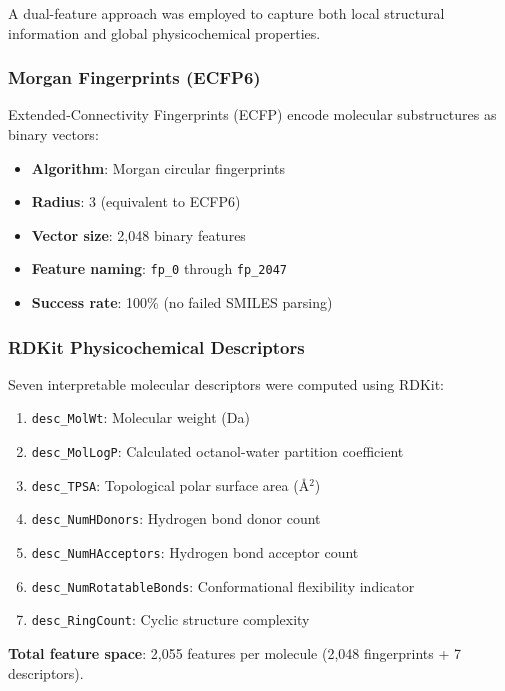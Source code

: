 \documentclass[11pt,a4paper]{article}
\newcommand{\smiles}{SMILES}
\begin{document}
A dual-feature approach was employed to capture both local structural information and global physicochemical properties.

\subsubsection{Morgan Fingerprints (ECFP6)}

Extended-Connectivity Fingerprints (ECFP) encode molecular substructures as binary vectors:

\begin{itemize}
    \item \textbf{Algorithm}: Morgan circular fingerprints
    \item \textbf{Radius}: 3 (equivalent to ECFP6)
    \item \textbf{Vector size}: 2,048 binary features
    \item \textbf{Feature naming}: \texttt{fp\_0} through \texttt{fp\_2047}
    \item \textbf{Success rate}: 100\% (no failed \smiles{} parsing)
\end{itemize}

\subsubsection{RDKit Physicochemical Descriptors}

Seven interpretable molecular descriptors were computed using RDKit:

\begin{enumerate}
    \item \texttt{desc\_MolWt}: Molecular weight (Da)
    \item \texttt{desc\_MolLogP}: Calculated octanol-water partition coefficient
    \item \texttt{desc\_TPSA}: Topological polar surface area (\AA$^2$)
    \item \texttt{desc\_NumHDonors}: Hydrogen bond donor count
    \item \texttt{desc\_NumHAcceptors}: Hydrogen bond acceptor count
    \item \texttt{desc\_NumRotatableBonds}: Conformational flexibility indicator
    \item \texttt{desc\_RingCount}: Cyclic structure complexity
\end{enumerate}

\textbf{Total feature space}: 2,055 features per molecule (2,048 fingerprints + 7 descriptors).
\end{document}
